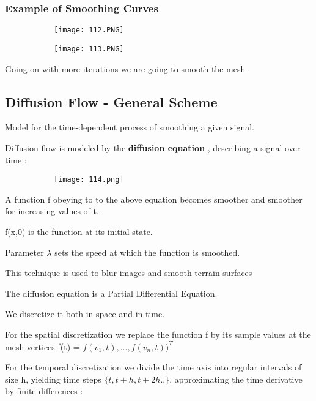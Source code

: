 \documentclass{article}
\begin{document}
\subsubsection{Example of Smoothing Curves}

\begin{figure}[ht!]
  \centering
  \begin{subfigure}[b]{0.49\linewidth}
    \texttt{[image: 112.PNG]}
  \end{subfigure}
     \begin{subfigure}[b]{0.49\textwidth}
         \centering
         \texttt{[image: 113.PNG]}
     \end{subfigure}
\end{figure}

Going on with more iterations we are going to smooth the mesh

\subsection{Diffusion Flow - General Scheme}

Model for the time-dependent process of smoothing a given signal.

Diffusion flow is modeled by the \textbf{diffusion equation} , describing a signal over time :

    \begin{figure}[ht!]
  \centering
  \begin{subfigure}[b]{0.3\linewidth}
    \texttt{[image: 114.png]}
  \end{subfigure}
\end{figure}

A function f obeying to to the above equation becomes smoother and smoother for increasing values of t.

f(x,0) is the function at its initial state.

Parameter $\lambda$ sets the speed at which the function is smoothed.

This technique is used to blur images and smooth terrain surfaces 

The diffusion equation is a Partial Differential Equation.

We discretize it both in space and in time.

For the spatial discretization we replace the function f by its sample values at the mesh vertices f(t) = $f(v_1,t),...,f(v_n,t))^T$

For the temporal discretization we divide the time axis into regular intervals of size h, yielding time steps $\{t,t+h,t+2h..\}$, approximating the time derivative by finite differences : 
\end{document}
